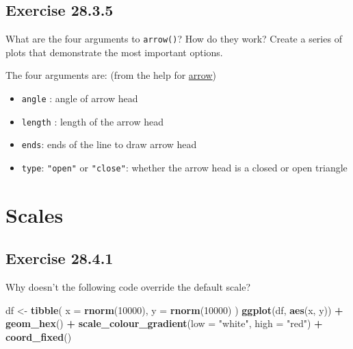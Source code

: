 \documentclass[]{book}
\newenvironment{Shaded}{\begin{snugshade}}{\end{snugshade}}
\newcommand{\DataTypeTok}[1]{\textcolor[rgb]{0.13,0.29,0.53}{#1}}
\newcommand{\DecValTok}[1]{\textcolor[rgb]{0.00,0.00,0.81}{#1}}
\newcommand{\KeywordTok}[1]{\textcolor[rgb]{0.13,0.29,0.53}{\textbf{#1}}}
\newcommand{\NormalTok}[1]{#1}
\newcommand{\OperatorTok}[1]{\textcolor[rgb]{0.81,0.36,0.00}{\textbf{#1}}}
\newcommand{\StringTok}[1]{\textcolor[rgb]{0.31,0.60,0.02}{#1}}
\providecommand{\tightlist}{%
  \setlength{\itemsep}{0pt}\setlength{\parskip}{0pt}}
\theoremstyle{plain}
\theoremstyle{remark}
\begin{document}
\hypertarget{exercise-28.3.5}{%
\subsection*{\texorpdfstring{Exercise
{28.3.5}}{Exercise 28.3.5}}\label{exercise-28.3.5}}

What are the four arguments to \texttt{arrow()}? How do they work?
Create a series of plots that demonstrate the most important options.

The four arguments are: (from the help for
\href{https://www.rdocumentation.org/packages/grid/versions/3.3.2/topics/arrow}{arrow})

\begin{itemize}
\tightlist
\item
  \texttt{angle} : angle of arrow head
\item
  \texttt{length} : length of the arrow head
\item
  \texttt{ends}: ends of the line to draw arrow head
\item
  \texttt{type}: \texttt{"open"} or \texttt{"close"}: whether the arrow
  head is a closed or open triangle
\end{itemize}

\hypertarget{scales}{%
\section{Scales}\label{scales}}

\hypertarget{exercise-28.4.1}{%
\subsection*{\texorpdfstring{Exercise
{28.4.1}}{Exercise 28.4.1}}\label{exercise-28.4.1}}

Why doesn't the following code override the default scale?

\begin{Shaded}
\begin{Highlighting}[]
\NormalTok{df <-}\StringTok{ }\KeywordTok{tibble}\NormalTok{(}
  \DataTypeTok{x =} \KeywordTok{rnorm}\NormalTok{(}\DecValTok{10000}\NormalTok{),}
  \DataTypeTok{y =} \KeywordTok{rnorm}\NormalTok{(}\DecValTok{10000}\NormalTok{)}
\NormalTok{)}
\KeywordTok{ggplot}\NormalTok{(df, }\KeywordTok{aes}\NormalTok{(x, y)) }\OperatorTok{+}
\StringTok{  }\KeywordTok{geom_hex}\NormalTok{() }\OperatorTok{+}
\StringTok{  }\KeywordTok{scale_colour_gradient}\NormalTok{(}\DataTypeTok{low =} \StringTok{"white"}\NormalTok{, }\DataTypeTok{high =} \StringTok{"red"}\NormalTok{) }\OperatorTok{+}
\StringTok{  }\KeywordTok{coord_fixed}\NormalTok{()}
\end{Highlighting}
\end{Shaded}
\end{document}
